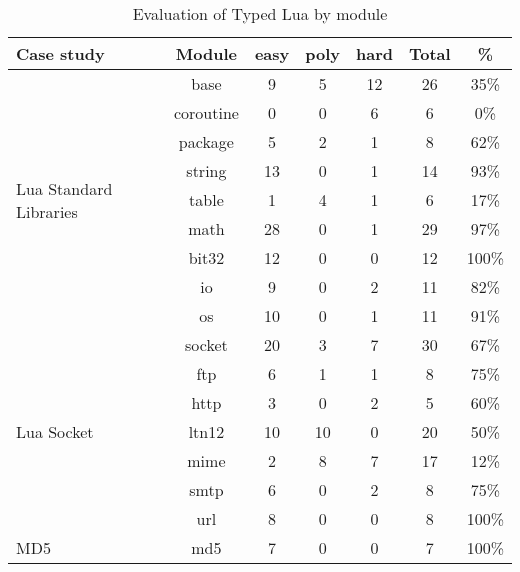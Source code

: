 \begin{table}[!ht]
\begin{center}
\begin{tabular}{|l|c|c|c|c|c|c|}
\hline
\textbf{Case study} & \textbf{Module} & \textbf{easy} & \textbf{poly} & \textbf{hard} & \textbf{Total} & \textbf{\%} \\
\hline
\multirow{9}{*}{Lua Standard Libraries}
& base & 9 & 5 & 12 & 26 & 35\% \\
\cline{2-7}
& coroutine & 0 & 0 & 6 & 6 & 0\% \\
\cline{2-7}
& package & 5 & 2 & 1 & 8 & 62\% \\
\cline{2-7}
& string & 13 & 0 & 1 & 14 & 93\% \\
\cline{2-7}
& table & 1 & 4 & 1 & 6 & 17\% \\
\cline{2-7}
& math & 28 & 0 & 1 & 29 & 97\% \\
\cline{2-7}
& bit32 & 12 & 0 & 0 & 12 & 100\% \\
\cline{2-7}
& io & 9 & 0 & 2 & 11 & 82\% \\
\cline{2-7}
& os & 10 & 0 & 1 & 11 & 91\% \\
\hline
\multirow{7}{*}{Lua Socket}
& socket & 20 & 3 & 7 & 30 & 67\% \\
\cline{2-7}
& ftp & 6 & 1 & 1 & 8 & 75\% \\
\cline{2-7}
& http & 3 & 0 & 2 & 5 & 60\% \\
\cline{2-7}
& ltn12 & 10 & 10 & 0 & 20 & 50\% \\
\cline{2-7}
& mime & 2 & 8 & 7 & 17 & 12\% \\
\cline{2-7}
& smtp & 6 & 0 & 2 & 8 & 75\% \\
\cline{2-7}
& url & 8 & 0 & 0 & 8 & 100\% \\
\hline
\multirow{1}{*}{MD5}
& md5 & 7 & 0 & 0 & 7 & 100\% \\
\hline
\end{tabular}
\end{center}
\caption{Evaluation of Typed Lua by module}
\label{tab:evalbymod}
\end{table}
